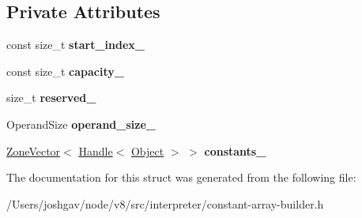 \subsection*{Private Attributes}
\begin{DoxyCompactItemize}
\item 
const size\+\_\+t {\bfseries start\+\_\+index\+\_\+}\hypertarget{structv8_1_1internal_1_1interpreter_1_1_b_a_s_e___e_m_b_e_d_d_e_d_1_1_constant_array_slice_a941811e727ea520fb65e9fd52e378bc2}{}\label{structv8_1_1internal_1_1interpreter_1_1_b_a_s_e___e_m_b_e_d_d_e_d_1_1_constant_array_slice_a941811e727ea520fb65e9fd52e378bc2}

\item 
const size\+\_\+t {\bfseries capacity\+\_\+}\hypertarget{structv8_1_1internal_1_1interpreter_1_1_b_a_s_e___e_m_b_e_d_d_e_d_1_1_constant_array_slice_abf8a5db0cb24e93a1a7807fa07d40eab}{}\label{structv8_1_1internal_1_1interpreter_1_1_b_a_s_e___e_m_b_e_d_d_e_d_1_1_constant_array_slice_abf8a5db0cb24e93a1a7807fa07d40eab}

\item 
size\+\_\+t {\bfseries reserved\+\_\+}\hypertarget{structv8_1_1internal_1_1interpreter_1_1_b_a_s_e___e_m_b_e_d_d_e_d_1_1_constant_array_slice_a9c4f9b54a05c9337d0e4c6ba2b62389f}{}\label{structv8_1_1internal_1_1interpreter_1_1_b_a_s_e___e_m_b_e_d_d_e_d_1_1_constant_array_slice_a9c4f9b54a05c9337d0e4c6ba2b62389f}

\item 
Operand\+Size {\bfseries operand\+\_\+size\+\_\+}\hypertarget{structv8_1_1internal_1_1interpreter_1_1_b_a_s_e___e_m_b_e_d_d_e_d_1_1_constant_array_slice_a736815052decf1f22e28463f5fdccede}{}\label{structv8_1_1internal_1_1interpreter_1_1_b_a_s_e___e_m_b_e_d_d_e_d_1_1_constant_array_slice_a736815052decf1f22e28463f5fdccede}

\item 
\hyperlink{classv8_1_1internal_1_1_zone_vector}{Zone\+Vector}$<$ \hyperlink{classv8_1_1internal_1_1_handle}{Handle}$<$ \hyperlink{classv8_1_1internal_1_1_object}{Object} $>$ $>$ {\bfseries constants\+\_\+}\hypertarget{structv8_1_1internal_1_1interpreter_1_1_b_a_s_e___e_m_b_e_d_d_e_d_1_1_constant_array_slice_ad9f5cc7095dddf4f1ee89503f817f413}{}\label{structv8_1_1internal_1_1interpreter_1_1_b_a_s_e___e_m_b_e_d_d_e_d_1_1_constant_array_slice_ad9f5cc7095dddf4f1ee89503f817f413}

\end{DoxyCompactItemize}


The documentation for this struct was generated from the following file\+:\begin{DoxyCompactItemize}
\item 
/\+Users/joshgav/node/v8/src/interpreter/constant-\/array-\/builder.\+h\end{DoxyCompactItemize}
